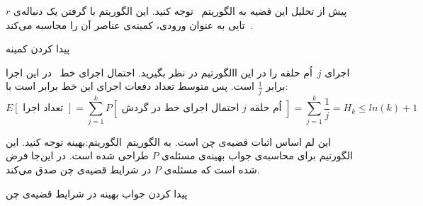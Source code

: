 پیش از تحلیل این قضیه به الگوریتم~ توجه کنید. این الگوریتم با گرفتن یک دنباله‌ی $r$~تایی به عنوان ورودی، کمینه‌ی عناصر آن را محاسبه می‌کند.
\begin{algorithm}
\caption{پیدا کردن کمینه}
\label{الگوریتم:کمینه}
\begin{algorithmic}[1]
		\label{خط:مقدار کمینه‌ی جدید}
	\EndIf
\EndFor
\State{}
\EndFunction
\end{algorithmic}
\end{algorithm}

اجرای $j$~اُم حلقه را در این االگورتیم در نظر بگیرید. احتمال اجرای خط~ در این اجرا برابر $\frac{1}{j}$ است. پس متوسط تعداد دفعات اجرای این خط برابر است با:
\[
E[\text{ تعداد اجرا }]
= \sum_{j=1}^k P[\text{ احتمال اجرای خط در گردش $j$~اُم حلقه }]
= \sum_{j=1}^k \frac{1}{j}
= H_k
\leq ln(k) + 1
\]

این لم اساس اثبات قضیه‌ی چن است. به الگوریتم~{الگوریتم:بهینه} توجه کنید. این الگورتیم برای محاسبه‌ی جواب بهینه‌ی مسئله‌ی $P$ طراحی شده است. در این‌جا فرض شده است که مسئله‌ی $P$ در شرایط قضیه‌ی چن صدق می‌کند.

\begin{algorithm}
\caption{پیدا کردن جواب بهینه در شرایط قضیه‌ی چن}
\label{الگوریتم:بهینه}
\begin{algorithmic}[1]
	\label{خط:ایجاد زیرمسئله‌ها}
		\label{خط:مقایسه با مقدار بهینه‌ی فعلی}
			\label{خط:مقدار بهینه‌ی جدید}
	\EndIf
\EndFor
\State{}
\EndFunction
\end{algorithmic}
\end{algorithm}

